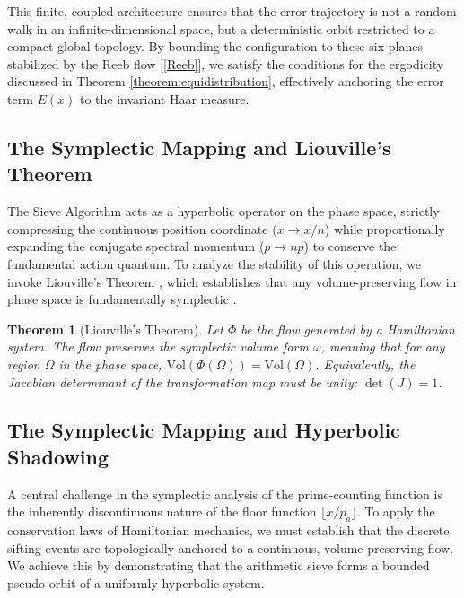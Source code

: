 \documentclass[sn-mathphys-num, pdflatex]{sn-jnl}
\newtheorem{theorem}{Theorem}[section]
\begin{document}
This finite, coupled architecture ensures that the error trajectory is not a random walk in an infinite-dimensional space, but a deterministic orbit restricted to a compact global topology. By bounding the configuration to these six planes stabilized by the Reeb flow [\ref{Reeb}], we satisfy the conditions for the ergodicity discussed in Theorem \ref{theorem:equidistribution}, effectively anchoring the error term $E(x)$ to the invariant Haar measure.

\subsection{The Symplectic Mapping and Liouville's Theorem}
\label{sec:map_definition}

The Sieve Algorithm acts as a hyperbolic operator on the phase space, strictly compressing the continuous position coordinate ($x \to x/n$) while proportionally expanding the conjugate spectral momentum ($p \to np$) to conserve the fundamental action quantum. To analyze the stability of this operation, we invoke Liouville's Theorem \cite{arnold1989}, which establishes that any volume-preserving flow in phase space is fundamentally symplectic .

\begin{theorem}[Liouville's Theorem]
\label{thm:liouville}
Let $\Phi$ be the flow generated by a Hamiltonian system. The flow preserves the symplectic volume form $\omega$, meaning that for any region $\Omega$ in the phase space, $\text{Vol}(\Phi(\Omega)) = \text{Vol}(\Omega)$. Equivalently, the Jacobian determinant of the transformation map must be unity: $\det(J) = 1$.
\end{theorem}
\subsection{The Symplectic Mapping and Hyperbolic Shadowing}

A central challenge in the symplectic analysis of the prime-counting function is the inherently discontinuous nature of the floor function $\lfloor x/p_{a} \rfloor$. To apply the conservation laws of Hamiltonian mechanics, we must establish that the discrete sifting events are topologically anchored to a continuous, volume-preserving flow. We achieve this by demonstrating that the arithmetic sieve forms a bounded pseudo-orbit of a uniformly hyperbolic system.
\end{document}
